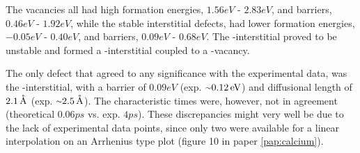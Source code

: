 The vacancies all had high formation energies, $1.56\unit{eV}$ - $2.83\unit{eV}$, and barriers, $0.46\unit{eV}$ - $1.92\unit{eV}$, while the stable interstitial defects, had lower formation energies, $-0.05\unit{eV}$ - $0.40\unit{eV}$, and barriers, $0.09\unit{eV}$ - $0.68\unit{eV}$.
The -interstitial proved to be unstable and formed a -interstitial coupled to a -vacancy.

The only defect that agreed to any significance with the experimental data, was the -interstitial, with a barrier of $0.09\unit{eV}$ (exp. $\mytilde0.12\unit{eV}$) and diffusional length of $2.1\, \mathrm{\mathring{\mathrm{A}}}$ (exp. $\mytilde2.5\unit{\mAA}$).
The characteristic times were, however, not in agreement (theoretical $0.06\unit{ps}$ vs. exp. $4\unit{ps}$).
These discrepancies might very well be due to the lack of experimental data points, since only two were available for a linear interpolation on an Arrhenius type plot (figure 10 in paper \ref{pap:calcium}).
